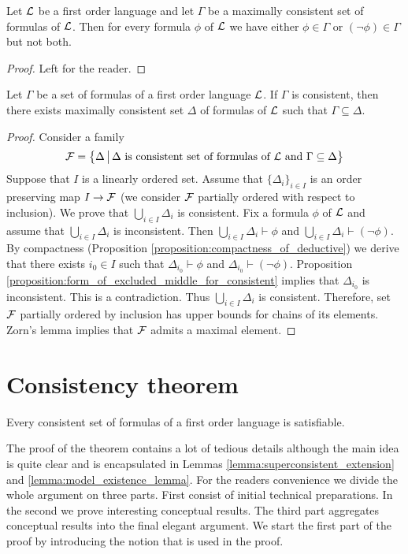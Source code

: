 \documentclass[10pt]{amsart}
\begin{document}
\begin{proposition}
	Let ${\mathcal L}$ be a first order language and let $\Gamma$ be a maximally consistent set of formulas of ${\mathcal L}$. Then for every formula $\phi$ of ${\mathcal L}$ we have either $\phi \in \Gamma$ or $(\neg \phi)\in \Gamma$ but not both.
\end{proposition}
\begin{proof}
	Left for the reader.
\end{proof}

\begin{proposition}\label{proposition:Lindenbaum_lemma}
	Let $\Gamma$ be a set of formulas of a first order language ${\mathcal L}$. If $\Gamma$ is consistent, then there exists maximally consistent set $\Delta$ of formulas of ${\mathcal L}$ such that $\Gamma \subseteq \Delta$.
\end{proposition}
\begin{proof}
	Consider a family
	$${\mathcal F} = \big\{\Delta \,\big|\,\Delta\mbox{ is consistent set of formulas of }{\mathcal L}\mbox{ and }\Gamma \subseteq \Delta \big\}$$
	Suppose that $I$ is a linearly ordered set. Assume that $\{\Delta_i\}_{i\in I}$ is an order preserving map $I \rightarrow {\mathcal F}$ (we consider ${\mathcal F}$ partially ordered with respect to inclusion). We prove that $\bigcup_{i\in I}\Delta_i$ is consistent. Fix a formula $\phi$ of ${\mathcal L}$ and assume that $\bigcup_{i\in I}\Delta_i$ is inconsistent. Then $\bigcup_{i\in I}\Delta_i\vdash \phi$ and $\bigcup_{i\in I}\Delta_i\vdash (\neg \phi)$. By compactness (Proposition \ref{proposition:compactness_of_deductive}) we derive that there exists $i_0\in I$ such that $\Delta_{i_0} \vdash \phi$ and $\Delta_{i_0} \vdash (\neg \phi)$. Proposition \ref{proposition:form_of_excluded_middle_for_consistent} implies that $\Delta_{i_0}$ is inconsistent. This is a contradiction. Thus $\bigcup_{i\in I}\Delta_i$ is consistent. Therefore, set ${\mathcal F}$ partially ordered by inclusion has upper bounds for chains of its elements. Zorn’s lemma implies that ${\mathcal F}$ admits a maximal element.
\end{proof}

\section{Consistency theorem}

\begin{theorem}\label{theorem:consistency_theorem}
	Every consistent set of formulas of a first order language is satisfiable.
\end{theorem}
\noindent
The proof of the theorem contains a lot of tedious details although the main idea is quite clear
and is encapsulated in Lemmas \ref{lemma:superconsistent_extension} and \ref{lemma:model_existence_lemma}. For the readers convenience we divide the whole argument
on three parts. First consist of initial technical preparations. In the second we prove interesting
conceptual results. The third part aggregates conceptual results into the final elegant argument.
We start the first part of the proof by introducing the notion that is used in the proof.
\end{document}
